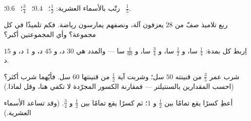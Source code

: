\begin{exercise}[$\star$]\label{exo:g5:fractions:7}
رتّب بالأسماء العشرية: $\frac12$؛ \ $0.4$؛ \ $\frac34$؛ \
$0.6$؛ \ $\frac15$.
\end{exercise}

\begin{exercise}[$\star$]\label{exo:g5:fractions:8}
ربع تلاميذ صفّ من $28$ يعزفون آلة، ونصفهم يمارسون
رياضة. فكم تلميذًا في كل مجموعة؟ وأي المجموعتين أكبر؟
\end{exercise}

\begin{exercise}[$\star$]\label{exo:g5:fractions:9}
اِربط كل  بمدة: $\frac14$ سا، و $\frac12$ سا،
و $\frac34$ سا، و $\frac{1}{60}$ سا --- والمدد هي $30$ د، و $45$ د، و $1$ د،
و $15$ د.
\end{exercise}

\begin{exercise}[$\star\star$]\label{exo:g5:fractions:10}
شرب عمر $\frac35$ من قنينته  $50$ سل؛ وشربت آية $\frac12$ من
قنينتها \omterm{def:g2:measure:units}{سعة} $60$ سل. فأيّهما شرب أكثر؟ (احسب المقدارين بالسنتيلتر ---
فمقارنة الكسور المجرّدة لا تكفي هنا، وقل لماذا.)
\end{exercise}

\begin{exercise}[$\star\star$]\label{exo:g5:fractions:11}
أعطِ كسرًا يقع تمامًا بين $\frac12$ و $1$؛ ثم كسرًا يقع
تمامًا بين $\frac12$ و $\frac34$. (وقد تساعد الأسماء
العشرية.)
\end{exercise}
